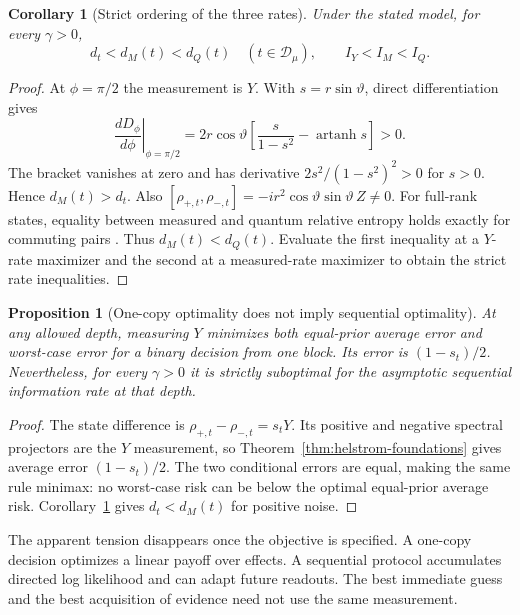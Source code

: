 \documentclass[11pt,a4paper]{article}
\newtheorem{proposition}[theorem]{Proposition}
\newtheorem{corollary}[theorem]{Corollary}
\theoremstyle{definition}
\theoremstyle{remark}
\numberwithin{equation}{section}
\begin{document}
\begin{corollary}[Strict ordering of the three rates]\label{cor:strict-rates}
Under the stated model, for every $\gamma>0$,
\begin{equation}\label{eq:strict-rate-order}
       d_t<d_M(t)<d_Q(t)\quad(t\in\mathcal D_\mu),
       \qquad I_Y<I_M<I_Q.
\end{equation}
\end{corollary}
\begin{proof}
At $\phi=\pi/2$ the measurement is $Y$. With $s=r\sin\vartheta$,
direct differentiation gives
\[
 \left.\frac{dD_\phi}{d\phi}\right|_{\phi=\pi/2}
 =2r\cos\vartheta\left[
     \frac{s}{1-s^2}-\operatorname{artanh}s\right]>0.
\]
The bracket vanishes at zero and has derivative
$2s^2/(1-s^2)^2>0$ for $s>0$. Hence $d_M(t)>d_t$.
Also
$[\rho_{+,t},\rho_{-,t}]=-ir^2\cos\vartheta\sin\vartheta\,Z\ne0$.
For full-rank states, equality between measured and quantum relative
entropy holds exactly for commuting pairs
\citep[Proposition 5]{berta2017}. Thus $d_M(t)<d_Q(t)$.
Evaluate the first inequality at a $Y$-rate maximizer and the second at
a measured-rate maximizer to obtain the strict rate inequalities.
\end{proof}

\begin{proposition}[One-copy optimality does not imply sequential optimality]
\label{prop:one-copy-versus-sequential}
At any allowed depth, measuring $Y$ minimizes both equal-prior average
error and worst-case error for a binary decision from one block. Its
error is $(1-s_t)/2$. Nevertheless, for every $\gamma>0$ it is strictly
suboptimal for the asymptotic sequential information rate at that depth.
\end{proposition}
\begin{proof}
The state difference is
$\rho_{+,t}-\rho_{-,t}=s_tY$. Its positive and negative spectral
projectors are the $Y$ measurement, so
Theorem~\ref{thm:helstrom-foundations} gives average error $(1-s_t)/2$.
The two conditional errors are equal, making the same rule minimax:
no worst-case risk can be below the optimal equal-prior average risk.
Corollary~\ref{cor:strict-rates} gives $d_t<d_M(t)$ for positive noise.
\end{proof}

The apparent tension disappears once the objective is specified.
A one-copy decision optimizes a linear payoff over effects. A sequential
protocol accumulates directed log likelihood and can adapt future readouts.
The best immediate guess and the best acquisition of evidence need not
use the same measurement.
\end{document}
